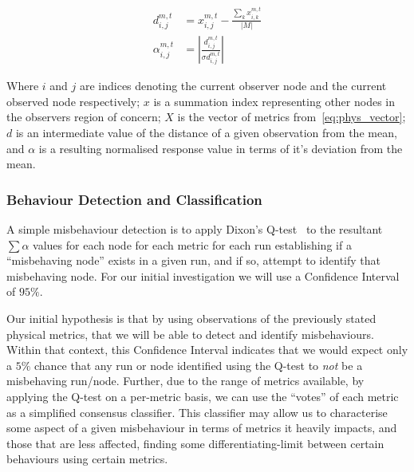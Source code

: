 \begin{align}
  d_{i,j}^{m,t} &= x_{i,j}^{m,t} - \frac{\sum_k x_{i,k}^{m,t}}{|M|}\label{eq:d}\\
  \alpha_{i,j}^{m,t} &= | \frac{d_{i,j}^{m,t}}{\sigma{d_{i,j}^{m,t}}}|\label{eq:dd}
\end{align}

Where $i$ and $j$ are indices denoting the current observer node and the current observed node respectively; $x$ is a summation index representing other nodes in the observers region of concern; $X$ is the vector of metrics from~\ref{eq:phys_vector}; $d$ is an intermediate value of the distance of a given observation from the mean, and $\alpha$ is a resulting normalised response value in terms of it's deviation from the mean.

\subsubsection{Behaviour Detection and Classification}
A simple misbehaviour detection is to apply Dixon's Q-test~\cite{Dean1951} to the resultant $\sum\alpha$ values for each node for each metric for each run establishing if a ``misbehaving node'' exists in a given run, and if so, attempt to identify that misbehaving node. 
For our initial investigation we will use a Confidence Interval of $95\%$.

Our initial hypothesis is that by using observations of the previously stated physical metrics, that we will be able to detect and identify misbehaviours.
Within that context, this Confidence Interval indicates that we would expect only a $5\%$ chance that any run or node identified using the Q-test to \emph{not} be a misbehaving run/node.
Further, due to the range of metrics available, by applying the Q-test on a per-metric basis, we can use the ``votes'' of each metric as a simplified consensus classifier.
This classifier may allow us to characterise some aspect of a given misbehaviour in terms of metrics it heavily impacts, and those that are less affected, finding some differentiating-limit between certain behaviours using certain metrics.


